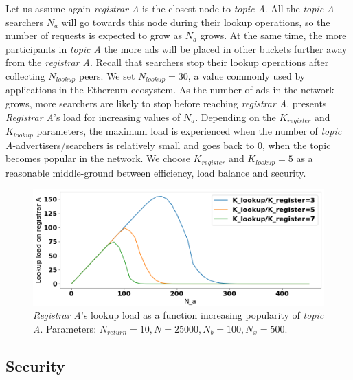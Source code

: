Let us assume again \emph{registrar A} is the closest node to \emph{topic A}. All the \emph{topic A} searchers $N_a$ will go towards this node during their lookup operations, so the number of requests is expected to grow as $N_a$ grows. At the same time, the more participants in \emph{topic A} the more ads will be placed in other buckets further away from the \emph{registrar A}. Recall that searchers stop their lookup operations after collecting $N_\textit{lookup}$ peers.  We set $N_\textit{lookup} = 30$, a value commonly used by applications in the Ethereum ecosystem. As the number of ads in the network grows, more searchers are likely to stop before reaching \emph{registrar A}.  presents \emph{Registrar A}'s load for increasing values of $N_a$. Depending on the $K_\textit{register}$ and $K_\textit{lookup}$ parameters, the maximum load is experienced when the number of \emph{topic A}-advertisers/searchers is relatively small and goes back to $0$, when the topic becomes popular in the network. We choose $K_\textit{register}$ and $K_\textit{lookup} =5$ as a reasonable middle-ground between efficiency, load balance and security.

\begin{figure}[t]
    \includegraphics[width=1\linewidth]{img/fairness_lookup}
    \vspace{-0.05in}
    \caption{\emph{Registrar A}'s lookup load as a function increasing popularity of \emph{topic A}.
		Parameters: $N_\textit{return}=10, N=25000, N_b=100, N_x=500$.}
    \label{fig:fairness_lookup}
    \vspace{-0.15in}
\end{figure}

\subsection{Security}

